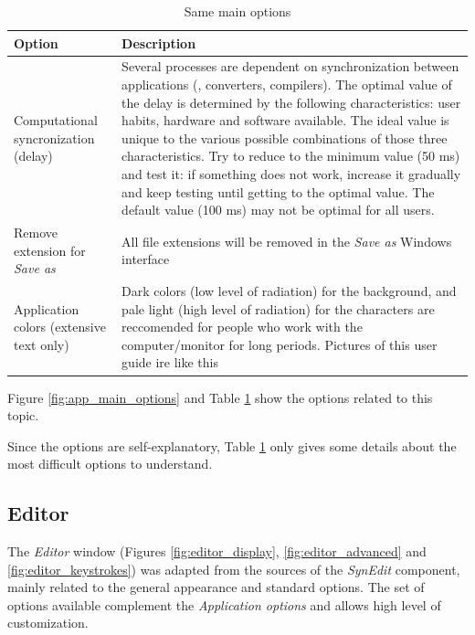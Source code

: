 \begin{table}
  \begin{footnotesize}
    \begin{tabularx}{\headwidth}{>{\hsize=0.35\hsize}X>{\hsize=0.65\hsize}X}\\
      \hline
      \textbf{Option} & \textbf{Description} \\
      \hline
      Computational syncronization (delay) & Several processes are dependent on synchronization between applications
       (\RR{}, converters, compilers). The optimal value of the delay is determined by the following characteristics:
       user habits, hardware and software available.
       The ideal value is unique to the various possible combinations of those three characteristics.
       Try to reduce to the minimum value (50 ms) and test it: if something does not work, increase it gradually
       and keep testing until getting to the optimal value. The default value (100 ms) may not be optimal for all users. \\
      Remove extension for \textit{Save as} & All file extensions will be removed
       in the \textit{Save as} Windows interface \\
      Application colors (extensive text only) & Dark colors (low level of radiation)
       for the background, and pale light (high level of radiation) for the characters
       are reccomended for people who work with the computer/monitor for long periods.
       Pictures of this user guide ire like this \\
      \hline
    \end{tabularx}
  \end{footnotesize}
  \caption{Same main options}
  \label{tab:app_main}
\end{table}

Figure \ref{fig:app_main_options} and
Table \ref{tab:app_main}
show the options related to this topic.

Since the options are self-explanatory, Table \ref{tab:app_main} only gives some
details about the most difficult options to understand.


\hypertarget{working_editor}{}
\subsection{Editor}

The \textit{Editor} window
(Figures \ref{fig:editor_display}, \ref{fig:editor_advanced} and \ref{fig:editor_keystrokes})
was adapted from the sources of the
\textit{SynEdit} component, mainly related to the general appearance and
standard options. The set of options available complement the
\textit{Application options} and allows high level of customization.


